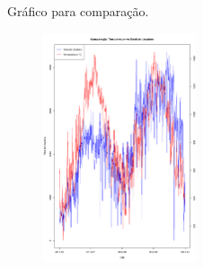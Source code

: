 \documentclass[a4paper,11pt]{article}
\begin{document}
\begin{description}[leftmargin=*]
Gráfico para comparação.

\begin{figure}[H] 
    \centering 
    \includegraphics[width=0.4\textwidth]{Imagens/Graficos/serie_temporal_comparação_3-4.png} 
\end{figure}

\end{description}

\newpage
\begin{appendices}


\end{appendices}
\end{document}
